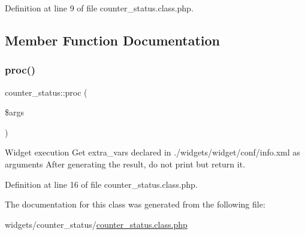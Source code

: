 Definition at line 9 of file counter\+\_\+status.\+class.\+php.



\subsection{Member Function Documentation}
\mbox{\label{classcounter__status_a46c561f1ad22adcd158d48d90e19588a}} 
\subsubsection{\texorpdfstring{proc()}{proc()}}
{\footnotesize\ttfamily counter\+\_\+status\+::proc (\begin{DoxyParamCaption}\item[{}]{\$args }\end{DoxyParamCaption})}



Widget execution Get extra\+\_\+vars declared in ./widgets/widget/conf/info.xml as arguments After generating the result, do not print but return it. 



Definition at line 16 of file counter\+\_\+status.\+class.\+php.



The documentation for this class was generated from the following file\+:\begin{DoxyCompactItemize}
\item 
widgets/counter\+\_\+status/\hyperlink{counter__status_8class_8php}{counter\+\_\+status.\+class.\+php}\end{DoxyCompactItemize}
